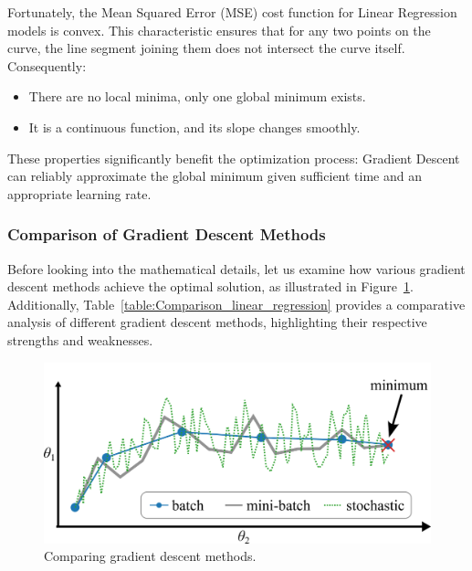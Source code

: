 \documentclass[12pt,letter]{article}
\begin{document}
Fortunately, the Mean Squared Error (MSE) cost function for Linear Regression models is convex. This characteristic ensures that for any two points on the curve, the line segment joining them does not intersect the curve itself. Consequently:
\begin{itemize}
\item There are no local minima, only one global minimum exists.
\item It is a continuous function, and its slope changes smoothly.
\end{itemize}

These properties significantly benefit the optimization process: Gradient Descent can reliably approximate the global minimum given sufficient time and an appropriate learning rate.






\subsubsection{Comparison of Gradient Descent Methods}

Before looking into the mathematical details, let us examine how various gradient descent methods achieve the optimal solution, as illustrated in Figure~\ref{fig:Comparing_gradient_descent_methods}. Additionally, Table~\ref{table:Comparison_linear_regression} provides a comparative analysis of different gradient descent methods, highlighting their respective strengths and weaknesses.


\begin{figure}[H]
	\centering
	\includegraphics[]{../figures/comparing_gradient_descent_methods}
	\caption{Comparing gradient descent methods.}
	\label{fig:Comparing_gradient_descent_methods}
\end{figure}
\end{document}
